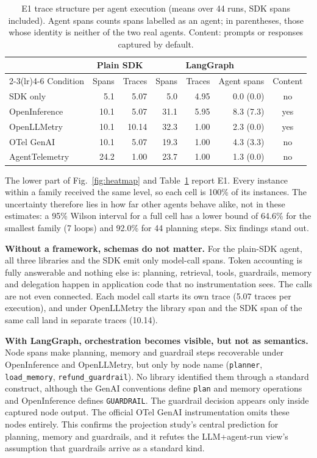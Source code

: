 \documentclass[conference]{IEEEtran}
\begin{document}
\begin{table}[t]
\centering
\scriptsize
\caption{E1 trace structure per agent execution (means over 44 runs,
SDK spans included). Agent spans counts spans labelled as an agent;
in parentheses, those whose identity is neither of the two real
agents. Content: prompts or responses captured by default.}
\label{tab:e1structure}
\setlength{\tabcolsep}{3.2pt}
\begin{tabular}{@{}lrrrrrc@{}}
\toprule
& \multicolumn{2}{c}{Plain SDK} & \multicolumn{3}{c}{LangGraph} & \\
\cmidrule(lr){2-3}\cmidrule(lr){4-6}
Condition & Spans & Traces & Spans & Traces & Agent spans & Content \\
\midrule
SDK only & 5.1 & 5.07 & 5.0 & 4.95 & 0.0 (0.0) & no \\
OpenInference & 10.1 & 5.07 & 31.1 & 5.95 & 8.3 (7.3) & yes \\
OpenLLMetry & 10.1 & 10.14 & 32.3 & 1.00 & 2.3 (0.0) & yes \\
OTel GenAI & 10.1 & 5.07 & 19.3 & 1.00 & 4.3 (3.3) & no \\
AgentTelemetry & 24.2 & 1.00 & 23.7 & 1.00 & 1.3 (0.0) & no \\
\bottomrule
\end{tabular}
\end{table}

The lower part of Fig.~\ref{fig:heatmap} and Table~\ref{tab:e1structure}
report E1. Every instance within a family received the same level, so
each cell is 100\% of its instances. The uncertainty therefore lies in
how far other agents behave alike, not in these estimates: a 95\%
Wilson interval for a full cell has a lower bound of 64.6\% for the
smallest family (7 loops) and 92.0\% for 44 planning steps. Six
findings stand out.

\textbf{Without a framework, schemas do not matter.} For the plain-SDK
agent, all three libraries and the SDK emit only model-call spans. Token
accounting is fully answerable and nothing else is: planning, retrieval,
tools, guardrails, memory and delegation happen in application code
that no instrumentation sees. The calls are not even connected. Each
model call starts its own trace (5.07 traces per execution), and under
OpenLLMetry the library span and the SDK span of the same call land in
separate traces (10.14).

\textbf{With LangGraph, orchestration becomes visible, but not as
semantics.} Node spans make planning, memory and guardrail steps
recoverable under OpenInference and OpenLLMetry, but only by node name
(\texttt{planner}, \texttt{load\_memory}, \texttt{refund\_guardrail}).
No library identified them through a standard construct, although
the GenAI conventions define \texttt{plan} and memory operations and
OpenInference defines \texttt{GUARDRAIL}. The guardrail decision
appears only inside captured node output. The official OTel GenAI
instrumentation omits these nodes entirely. This confirms the
projection study's central prediction for planning, memory and
guardrails, and it refutes the LLM+agent-run view's assumption that
guardrails arrive as a standard kind.
\end{document}
